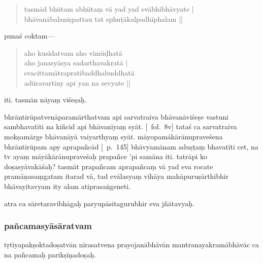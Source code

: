 \documentclass[12pt]{book}
\begin{document}
\begin{quote}
	tasmād bhūtam abhūtaṃ vā yad yad evābhibhāvyate | \\
	bhāvanābalaniṣpattau tat sphuṭākalpadhīphalam\footnoteB{
		kalpadhīphalam] \emd ; kalpadhīḥ phalam \MS\ \EDD
	} ||

\end{quote}

punaś coktam—

\begin{quote}
	aho kusīdatvam aho vimūḍhatā\\
	aho janasyāsya sadarthavakratā |\\
	svacittamātrapratibaddhabuddhatā\footnoteB{
		°pratibaddha°] \conj\ (\TIB; 'brel pa); °pratibuddha° \MS\ \EDD
	}\\
	adūravartiny api yan na sevyate ||
% 
\end{quote}

\noindent iti. tasmān nāyaṃ viśeṣaḥ.

bhrāntirūpatvenāparamārthatvam api sarvatraiva bhāvanāviśeṣe vastuni sambhavatīti na kiñcid api bhāvanīyaṃ syāt. [\MS\ fol.\ 8v] tataś ca sarvatraiva mokṣamārge bhāvanāyā vaiyarthyaṃ syāt. māyopamākārānupraveśena bhrāntirūpam apy aprapañcād [\EDD\ p.\ 145] bhāvyamānam\footnoteB{
	aprapañcād bhāvyamānam] \EDD ; aprapañcā bhāvyamāṇam
} aduṣṭaṃ bhavatīti cet, na tv ayaṃ māyākārānupraveśaḥ prapañce 'pi samāna iti. tatrāpi ko doṣasyāvakāśaḥ? tasmāt prapañcam aprapañcaṃ vā yad eva rocate pramāṇasaṃgatam itarad vā, tad evālasyaṃ vihāya mahāpuruṣārthibhir bhāvayitavyam\footnoteB{
	bhāvayitavyam] \EDD ; bhaviyitavyam \MS
} ity alam atiprasaṅgeneti.

atra ca sāretaravibhāgaḥ paryupāsitagurubhir eva jñātavyaḥ.

\subsubsection{pañcamasyāsāratvam}
\noindent tṛtīyapakṣoktadoṣatvān nīrasatvena\footnoteB{
	nīrasatvena] \conj ; nīrasatvena te \MS\ \EDD
} prayojanābhāvān mantranayakramābhāvāc ca na pañcamaḥ parikṣīṇadoṣaḥ.
\end{document}
